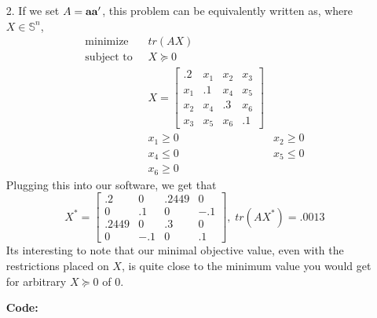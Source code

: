 \documentclass[11pt]{article}
\theoremstyle{definition}
\begin{document}
\begin{itemize}
    \item[2.]
        If we set \(A={\bf aa}'\), this problem can be equivalently written as, where \(X\in\mathbb{S}^n\),
        \begin{align*}
            \text{minimize    }\; & tr(AX) \\
            \text{subject to  }\; & X \succeq 0 \\
                                  & X =\left[ \begin{array}{cccc} .2  & x_1 & x_2 & x_3 \\
                                                                  x_1 & .1  & x_4 & x_5 \\
                                                                  x_2 & x_4 & .3  & x_6 \\
                                                                  x_3 & x_5 & x_6 & .1 \end{array} \right]  \\
                                  & x_1 \geq 0 & x_2 \geq 0 \\
                                  & x_4 \leq 0 & x_5 \leq 0 \\
                                  & x_6 \geq 0
        \end{align*}
        Plugging this into our software, we get that
        \[X^* = \left[ \begin{array}{cccc} .2    & 0   & .2449 &   0 \\
                                            0    & .1  &    0  & -.1 \\
                                           .2449 & 0   & .3    &   0 \\
                                            0    & -.1 &    0  &   .1 \end{array} \right],
         \; tr(AX^*) = .0013 \]
        Its interesting to note that our minimal objective value, even with the restrictions placed on $X$, is quite close to the minimum value you would get for arbitrary $X\succeq0$ of 0.  

        {\bf Code:} \\
        


        
                        
    
        
\end{itemize}
\end{document}
